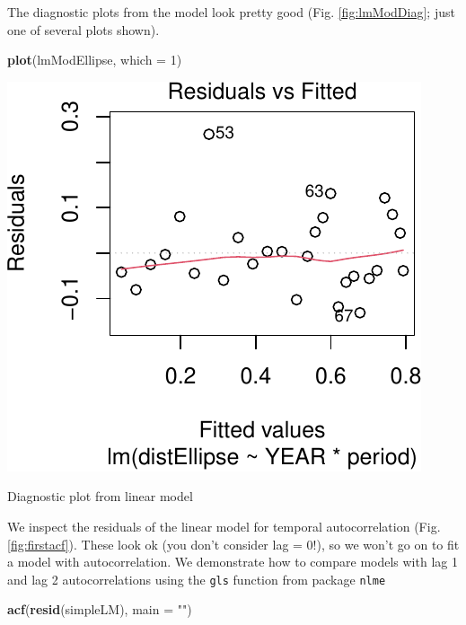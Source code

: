 \documentclass[nofonts,]{tufte-handout}
\newenvironment{Shaded}{\begin{snugshade}}{\end{snugshade}}
\newcommand{\AttributeTok}[1]{\textcolor[rgb]{0.13,0.29,0.53}{#1}}
\newcommand{\DecValTok}[1]{\textcolor[rgb]{0.00,0.00,0.81}{#1}}
\newcommand{\FunctionTok}[1]{\textcolor[rgb]{0.13,0.29,0.53}{\textbf{#1}}}
\newcommand{\NormalTok}[1]{#1}
\newcommand{\StringTok}[1]{\textcolor[rgb]{0.31,0.60,0.02}{#1}}
\begin{document}
The diagnostic plots from the model look pretty good (Fig.
\ref{fig:lmModDiag}; just one of several plots shown).

\begin{Shaded}
\begin{Highlighting}[]
\FunctionTok{plot}\NormalTok{(lmModEllipse, }\AttributeTok{which =} \DecValTok{1}\NormalTok{)}
\end{Highlighting}
\end{Shaded}

\begin{marginfigure}
\includegraphics{Technical-supplement_files/figure-latex/lmModDiag-1} \caption[Diagnostic plot from linear model]{Diagnostic plot from linear model}\label{fig:lmModDiag}
\end{marginfigure}

We inspect the residuals of the linear model for temporal
autocorrelation (Fig. \ref{fig:firstacf}). These look ok (you don't
consider lag = 0!), so we won't go on to fit a model with
autocorrelation. We demonstrate how to compare models with lag 1 and lag
2 autocorrelations using the \texttt{gls} function from package
\texttt{nlme}

\begin{Shaded}
\begin{Highlighting}[]
\FunctionTok{acf}\NormalTok{(}\FunctionTok{resid}\NormalTok{(simpleLM), }\AttributeTok{main =} \StringTok{""}\NormalTok{)}
\end{Highlighting}
\end{Shaded}
\end{document}
